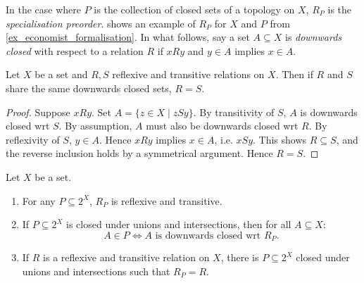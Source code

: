 In the case where $P$ is the collection of closed sets of a topology on $X$,
$R_P$ is the \emph{specialisation preorder}.
%
 shows an example of $R_P$ for $X$ and $P$ from
\cref{ex_economist_formalisation}.
%
In what follows, say a set $A \subseteq X$ is \emph{downwards closed} with
respect to a relation $R$ if $xRy$ and $y \in A$ implies $x \in A$.

\begin{lemma}
\label{lemma_same_dc_sets_implies_equality}
    Let $X$ be a set and $R, S$ reflexive and transitive relations on $X$. Then
    if $R$ and $S$ share the same downwards closed sets, $R = S$.
\end{lemma}
\begin{proof}
    Suppose $xRy$. Set $A = \{z \in X \mid zSy\}$. By transitivity of $S$, $A$
    is downwards closed wrt $S$.  By assumption, $A$ must also be downwards
    closed wrt $R$. By reflexivity of $S$, $y \in A$. Hence $xRy$ implies $x
    \in A$, i.e. $xSy$. This shows $R \subseteq S$, and the reverse inclusion
    holds by a symmetrical argument. Hence $R = S$.
\end{proof}

\begin{lemma}
\label{lemma_p_to_rp_mapping}
    Let $X$ be a set.

    \begin{enumerate}\small
        \item\label{item_rp_ref_and_tr} For any $P \subseteq 2^X$, $R_P$ is
            reflexive and transitive.

        \item\label{item_rp_dc_property} If $P \subseteq 2^X$ is closed under
             unions and intersections, then for all $A \subseteq X$:
            \[
                A \in P \iff A \text{ is downwards closed wrt } R_P.
            \]

        \item\label{item_rp_surjectivity} If $R$ is a reflexive and transitive
            relation on $X$, there is $P \subseteq 2^X$ closed under unions and
            intersections such that $R_P = R$.
    \end{enumerate}
\end{lemma}

